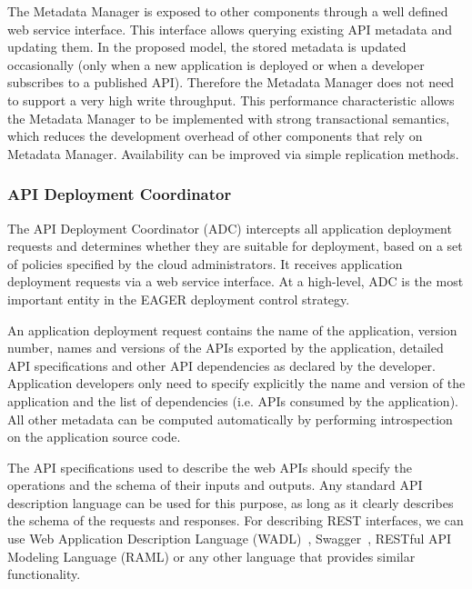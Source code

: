 The Metadata Manager is exposed to other components through a well defined web service interface.
This interface allows querying existing API metadata and updating them. In the proposed model, the stored metadata is updated 
occasionally (only when a new application is deployed or when a developer subscribes to a published API). Therefore the Metadata Manager
does not need to support a very high write throughput. This performance
characteristic allows the Metadata Manager to be implemented with strong 
transactional semantics,
which reduces the development overhead of other components that rely on Metadata Manager. Availability can be improved via
simple replication methods.

\subsubsection{API Deployment Coordinator} 
\label{sec:adc}
The API Deployment Coordinator (ADC)
intercepts all application deployment requests and determines whether they are
suitable for deployment, based on a set of policies specified by the cloud
administrators. It receives application deployment requests via a web service
interface. At a high-level, ADC is the most important entity in the EAGER deployment
control strategy.

An application deployment request contains the name of the application,
version number, names and versions of the APIs exported by the application,
detailed API specifications and other API dependencies as declared by the
developer. Application developers only need to specify explicitly the name and
version of the application and the list of dependencies (i.e. APIs consumed by
the application). All other metadata can be computed automatically by
performing introspection on the application source code. 

The API specifications used to describe the web APIs should specify the
operations and the schema of their inputs and outputs.  Any standard API
description language can be used for this purpose, as long as it clearly
describes the schema of the requests and responses. For describing REST
interfaces, we can use Web Application Description Language (WADL)~\cite{hl:wadl}, Swagger~\cite{hl:swagger},
RESTful API Modeling Language (RAML) or any other language that provides similar functionality. %

